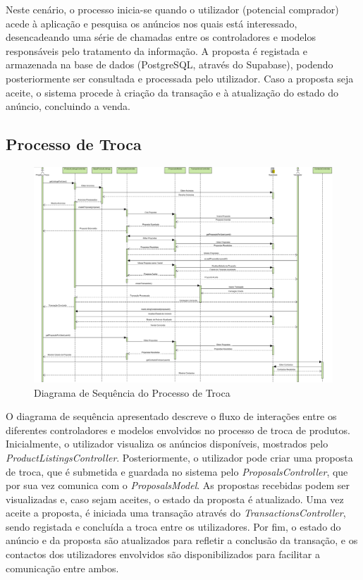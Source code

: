 \documentclass[a4paper, 12pt]{article} %
\begin{document}
Neste cenário, o processo inicia-se quando o utilizador (potencial comprador) acede à aplicação e pesquisa os anúncios nos quais está interessado, desencadeando uma série de chamadas entre os controladores e modelos responsáveis pelo tratamento da informação. A proposta é registada e armazenada na base de dados (PostgreSQL, através do Supabase), podendo posteriormente ser consultada e processada pelo utilizador. Caso a proposta seja aceite, o sistema procede à criação da transação e à atualização do estado do anúncio, concluindo a venda.

\subsection{Processo de Troca}
\begin{figure}[ht]
	\centering
	\includegraphics[width=\textwidth]{../images/sequence-diagram-swap.png}
	\caption{Diagrama de Sequência do Processo de Troca}
	\label{fig:diagrama_sequencia_troca}
\end{figure}

O diagrama de sequência apresentado descreve o fluxo de interações entre os diferentes controladores e modelos envolvidos no processo de troca de produtos. Inicialmente, o utilizador visualiza os anúncios disponíveis, mostrados pelo \textit{ProductListingsController}. Posteriormente, o utilizador pode criar uma proposta de troca, que é submetida e guardada no sistema pelo \textit{ProposalsController}, que por sua vez comunica com o \textit{ProposalsModel}. As propostas recebidas podem ser visualizadas e, caso sejam aceites, o estado da proposta é atualizado. Uma vez aceite a proposta, é iniciada uma transação através do \textit{TransactionsController}, sendo registada e concluída a troca entre os utilizadores. Por fim, o estado do anúncio e da proposta são atualizados para refletir a conclusão da transação, e os contactos dos utilizadores envolvidos são disponibilizados para facilitar a comunicação entre ambos.
\end{document}

